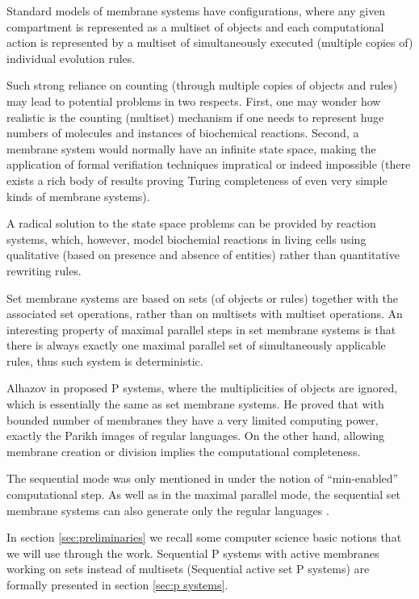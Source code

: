 \documentclass[llncs,submission,copyright,creativecommons]{../lib/lncs/llncs}
\begin{document}
Standard models of membrane systems have configurations, where any given compartment is represented as a multiset of objects and each computational action is represented by a multiset of simultaneously executed (multiple copies of) individual evolution rules.

Such strong reliance on counting (through multiple copies of objects and rules) may lead to potential problems in two respects. First, one may wonder how realistic is the counting (multiset) mechanism if one needs to represent huge numbers of molecules and instances of biochemical reactions. Second, a membrane system would normally have an infinite state space, making the application
of formal verifiation techniques impratical or indeed impossible (there exists a rich body of results proving Turing completeness of even very simple kinds of membrane systems).

A radical solution to the state space problems can be provided by reaction systems, which, however, model biochemial reactions in living cells using qualitative (based on presence and absence of entities) rather than quantitative rewriting rules.

Set membrane systems \cite{Kleijn11SetMembrane} are based on sets (of objects or rules) together with the associated set operations, rather than on multisets with multiset operations. An interesting property of maximal parallel steps in set membrane systems is that there is always exactly one maximal parallel set of simultaneously applicable rules, thus such system is deterministic.

Alhazov in \cite{Alhazov05WithoutMultiplicities} proposed P systems, where the multiplicities of objects are ignored, which is essentially the same as set membrane systems. He proved that with bounded number of membranes they have a very limited computing power, exactly the Parikh images of regular languages. On the other hand, allowing membrane creation or division implies the computational completeness.

The sequential mode was only mentioned in \cite{Kleijn11SetMembrane} under the notion of ``min-enabled'' computational step. As well as in the maximal parallel mode, the sequential set membrane systems can also generate only the regular languages \cite{Alhazov05WithoutMultiplicities}.

In section \ref{sec:preliminaries} we recall some computer science basic notions that we will use through the work. Sequential P systems with active membranes working on sets instead of multisets (Sequential active set P systems) are formally presented in section \ref{sec:p systems}.
\end{document}
